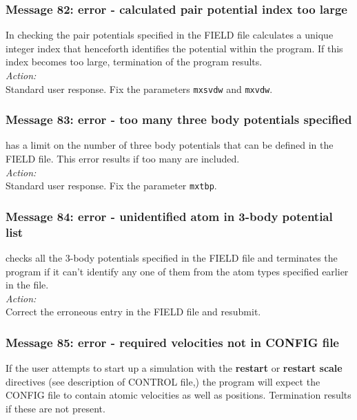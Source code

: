 \subsubsection*{Message 82: error - calculated pair potential index too large}

In checking the pair potentials specified in the FIELD file \D{}
calculates a unique integer index that henceforth identifies the
potential within the program. If this index becomes too large,
termination of the program results. \\ 

\noindent
{\em Action:} \\ 
Standard user response. Fix the parameters {\tt mxsvdw} and {\tt mxvdw}.

\subsubsection*{Message 83: error - too many three
body  potentials
specified}

\D{} has a limit on the number of three body potentials that
can be defined in the FIELD file. This error results if too many are
included. \\

\noindent
{\em Action:} \\
Standard user response. Fix the parameter {\tt mxtbp}.

\subsubsection*{Message 84: error - unidentified atom in 3-body potential list}

\D{} checks all the 3-body  potentials specified in the FIELD file
and terminates the program if it can't identify any one of them from
the atom types specified earlier in the file. \\ 

\noindent
{\em Action:} \\ 
Correct the erroneous entry in the FIELD file and resubmit.

\subsubsection*{Message 85: error - required velocities not in CONFIG file}

If the user attempts to start up a \D{} simulation with the {\bf restart} or {\bf
restart scale} directives (see description of CONTROL file,) the
program will expect the CONFIG file to contain atomic velocities as
well as positions. Termination results if these are not present. \\

